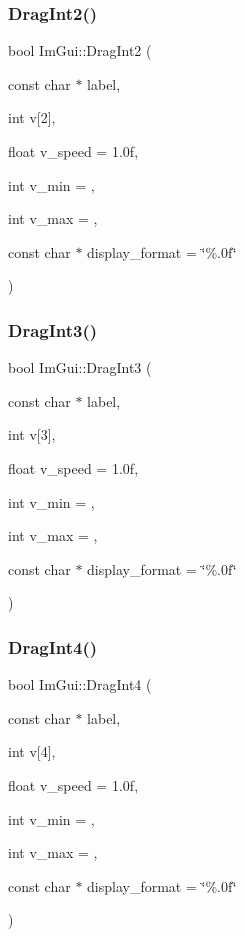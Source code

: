 \subsubsection{\texorpdfstring{Drag\+Int2()}{DragInt2()}}
{\footnotesize\ttfamily bool Im\+Gui\+::\+Drag\+Int2 (\begin{DoxyParamCaption}\item[{const char $\ast$}]{label,  }\item[{int}]{v\mbox{[}2\mbox{]},  }\item[{float}]{v\+\_\+speed = {\ttfamily 1.0f},  }\item[{int}]{v\+\_\+min = {},  }\item[{int}]{v\+\_\+max = {},  }\item[{const char $\ast$}]{display\+\_\+format = {\ttfamily \char`\"{}\%.0f\char`\"{}} }\end{DoxyParamCaption})}

\hypertarget{namespace_im_gui_ab0b40f3d0631113d54fa8e0c90ed4f77}{}\label{namespace_im_gui_ab0b40f3d0631113d54fa8e0c90ed4f77} 
\subsubsection{\texorpdfstring{Drag\+Int3()}{DragInt3()}}
{\footnotesize\ttfamily bool Im\+Gui\+::\+Drag\+Int3 (\begin{DoxyParamCaption}\item[{const char $\ast$}]{label,  }\item[{int}]{v\mbox{[}3\mbox{]},  }\item[{float}]{v\+\_\+speed = {\ttfamily 1.0f},  }\item[{int}]{v\+\_\+min = {},  }\item[{int}]{v\+\_\+max = {},  }\item[{const char $\ast$}]{display\+\_\+format = {\ttfamily \char`\"{}\%.0f\char`\"{}} }\end{DoxyParamCaption})}

\hypertarget{namespace_im_gui_a65b6e42ba7a4aa73fd3e1dc74f93d180}{}\label{namespace_im_gui_a65b6e42ba7a4aa73fd3e1dc74f93d180} 
\subsubsection{\texorpdfstring{Drag\+Int4()}{DragInt4()}}
{\footnotesize\ttfamily bool Im\+Gui\+::\+Drag\+Int4 (\begin{DoxyParamCaption}\item[{const char $\ast$}]{label,  }\item[{int}]{v\mbox{[}4\mbox{]},  }\item[{float}]{v\+\_\+speed = {\ttfamily 1.0f},  }\item[{int}]{v\+\_\+min = {},  }\item[{int}]{v\+\_\+max = {},  }\item[{const char $\ast$}]{display\+\_\+format = {\ttfamily \char`\"{}\%.0f\char`\"{}} }\end{DoxyParamCaption})}

